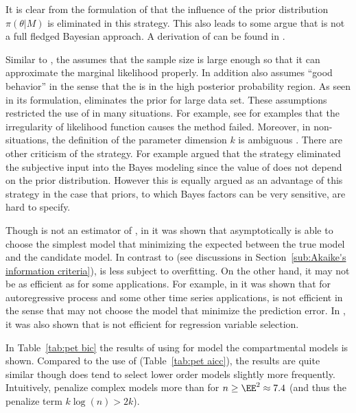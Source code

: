It is clear from the formulation of \bic that the influence of the prior
distribution $\pi(\theta|M)$ is eliminated in this strategy. This also leads
to some argue that \bic is not a full fledged Bayesian approach. A derivation
of \bic can be found in \cite[][sec.~3.2]{Claeskens:2008tq}.

Similar to \aic, the \bic assumes that the sample size is large enough so that
it can approximate the marginal likelihood properly. In addition \bic also
assumes ``good behavior'' in the sense that the \mle is in the high posterior
probability region. As seen in its formulation, \bic eliminates the prior for
large data set. These assumptions restricted the use of \bic in many
situations. For example, see \cite{Berger:2001uy} for examples that the
irregularity of likelihood function causes the \bic method failed. Moreover,
in non-\iid situations, the definition of the parameter dimension $k$ is
ambiguous \cite{Spiegelhalter:1998uc, Kass:1995vb}. There are other criticism
of the \bic strategy. For example \cite[][sec.~7.2.3]{Robert:2007tc} argued
that the \bic strategy eliminated the subjective input into the Bayes modeling
since the value of \bic does not depend on the prior distribution. However
this is equally argued as an advantage of this strategy in the case that
priors, to which Bayes factors can be very sensitive, are hard to specify.

Though \bic is not an estimator of \kld, in \cite{Sin:1996vs} it was shown
that asymptotically \bic is able to choose the simplest model that minimizing
the expected \kld between the true model and the candidate model. In contrast
to \aic (see discussions in Section~\ref{sub:Akaike's information criteria}),
\bic is less subject to overfitting. On the other hand, it may not be as
efficient as \aic for some applications. For example, in \cite{Lee:2001tm} it
was shown that for autoregressive process and some other time series
applications, \bic is not efficient in the sense that \bic may not choose the
model that minimize the prediction error. In
\cite[][sec.~4.7]{Claeskens:2008tq}, it was also shown that \bic is not
efficient for regression variable selection.

In Table~\ref{tab:pet bic} the results of using \bic for model the \pet
compartmental models is shown. Compared to the use of \aicc
(Table~\ref{tab:pet aicc}), the results are quite similar though \bic does
tend to select lower order models slightly more frequently. Intuitively, \bic
penalize complex models more than \aic for $n\ge\EE^2\approx7.4$ (and thus the
penalize term $k\log(n) > 2k$).

